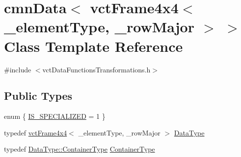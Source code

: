 \hypertarget{classcmn_data_3_01vct_frame4x4_3_01__element_type_00_01__row_major_01_4_01_4}{}\section{cmn\+Data$<$ vct\+Frame4x4$<$ \+\_\+element\+Type, \+\_\+row\+Major $>$ $>$ Class Template Reference}
\label{classcmn_data_3_01vct_frame4x4_3_01__element_type_00_01__row_major_01_4_01_4}


{\ttfamily \#include $<$vct\+Data\+Functions\+Transformations.\+h$>$}

\subsection*{Public Types}
\begin{DoxyCompactItemize}
\item 
enum \{ \hyperlink{classcmn_data_3_01vct_frame4x4_3_01__element_type_00_01__row_major_01_4_01_4_abb61e8644a515ceda547cfa5509bee9fab636969b812f98e416dafe8de3caa814}{I\+S\+\_\+\+S\+P\+E\+C\+I\+A\+L\+I\+Z\+E\+D} = 1
 \}
\item 
typedef \hyperlink{classvct_frame4x4}{vct\+Frame4x4}$<$ \+\_\+element\+Type, \+\_\+row\+Major $>$ \hyperlink{classcmn_data_3_01vct_frame4x4_3_01__element_type_00_01__row_major_01_4_01_4_abf4e17a9d0af654027bedb454326d1d2}{Data\+Type}
\item 
typedef \hyperlink{classvct_frame4x4_a3174a2ddafc9ae2b74009bab0c2b47c4}{Data\+Type\+::\+Container\+Type} \hyperlink{classcmn_data_3_01vct_frame4x4_3_01__element_type_00_01__row_major_01_4_01_4_ae99fda61ec4aed99e356a16b3fdbf448}{Container\+Type}
\end{DoxyCompactItemize}
